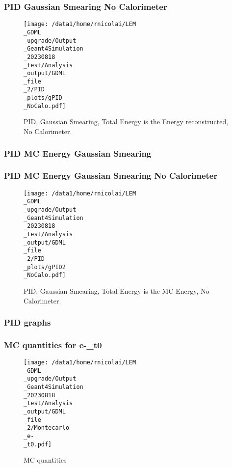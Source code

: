 \documentclass[8pt]{beamer}
\begin{document}
            \begin{frame}
                \frametitle{PID Gaussian Smearing No Calorimeter}
            
        \begin{figure}[h]
            \centering
            \texttt{[image: /data1/home/rnicolai/LEM\\\_GDML\\\_upgrade/Output\\\_Geant4Simulation\\\_20230818\\\_test/Analysis\\\_output/GDML\\\_file\\\_2/PID\\\_plots/gPID\\\_NoCalo.pdf]}
            \caption{PID, Gaussian Smearing, Total Energy is the Energy reconstructed, No Calorimeter.}
        \end{figure}
        
            \end{frame}
            
            \begin{frame}
                \frametitle{PID MC Energy Gaussian Smearing}
            
            \end{frame}
            
            \begin{frame}
                \frametitle{PID MC Energy Gaussian Smearing No Calorimeter}
            
        \begin{figure}[h]
            \centering
            \texttt{[image: /data1/home/rnicolai/LEM\\\_GDML\\\_upgrade/Output\\\_Geant4Simulation\\\_20230818\\\_test/Analysis\\\_output/GDML\\\_file\\\_2/PID\\\_plots/gPID2\\\_NoCalo.pdf]}
            \caption{PID, Gaussian Smearing, Total Energy is the MC Energy, No Calorimeter.}
        \end{figure}
        
            \end{frame}
            
            \begin{frame}
                \frametitle{PID graphs}
            
            \end{frame}
            
            \begin{frame}
                \frametitle{MC quantities for e-\_t0}
            
        \begin{figure}[h]
            \centering
            \texttt{[image: /data1/home/rnicolai/LEM\\\_GDML\\\_upgrade/Output\\\_Geant4Simulation\\\_20230818\\\_test/Analysis\\\_output/GDML\\\_file\\\_2/Montecarlo\\\_e-\\\_t0.pdf]}
            \caption{MC quantities}
        \end{figure}
        
            \end{frame}
            
\end{document}
